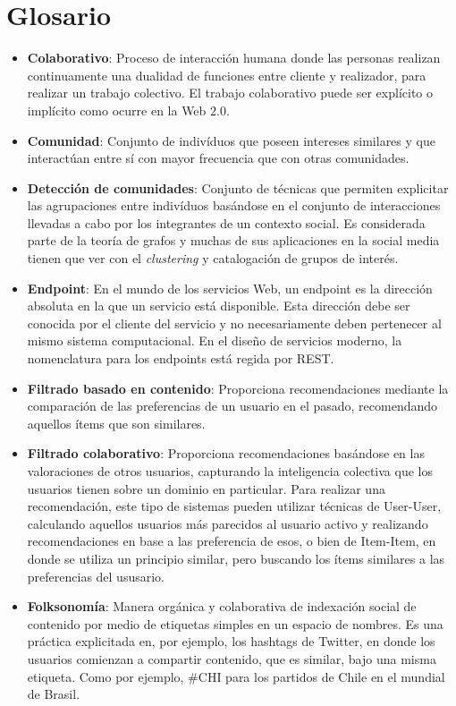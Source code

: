
\chapter{Glosario}

\begin{itemize}
	\item \textbf{Colaborativo}: Proceso de interacción humana donde las personas realizan continuamente una dualidad de funciones entre cliente y realizador, para realizar un trabajo colectivo. El trabajo colaborativo puede ser explícito o implícito como ocurre en la Web 2.0.
	\item \textbf{Comunidad}: Conjunto de indivíduos que poseen intereses similares y que interactúan entre sí con mayor frecuencia que con otras comunidades.
	\item \textbf{Detección de comunidades}: Conjunto de técnicas que permiten explicitar las agrupaciones entre indivíduos basándose en el conjunto de interacciones llevadas a cabo por los integrantes de un contexto social. Es considerada parte de la teoría de grafos y muchas de sus aplicaciones en la social media tienen que ver con el \textit{clustering} y catalogación de grupos de interés.
	\item \textbf{Endpoint}: En el mundo de los servicios Web, un endpoint es la dirección absoluta en la que un servicio está disponible. Esta dirección debe ser conocida por el cliente del servicio y no necesariamente deben pertenecer al mismo sistema computacional. En el diseño de servicios moderno, la nomenclatura para los endpoints está regida por REST.
	\item \textbf{Filtrado basado en contenido}: Proporciona recomendaciones mediante la comparación de las preferencias de un usuario en el pasado, recomendando aquellos ítems que son similares.
	\item \textbf{Filtrado colaborativo}: Proporciona recomendaciones basándose en las valoraciones de otros usuarios, capturando la inteligencia colectiva que los usuarios tienen sobre un dominio en particular. Para realizar una recomendación, este tipo de sistemas pueden utilizar técnicas de User-User, calculando aquellos usuarios más parecidos al usuario activo y realizando recomendaciones en base a las preferencia de esos, o bien de Item-Item, en donde se utiliza un principio similar, pero buscando los ítems similares a las preferencias del ususario.
	\item \textbf{Folksonomía}: Manera orgánica y colaborativa de indexación social de contenido por medio de etiquetas simples en un espacio de nombres. Es una práctica explicitada en, por ejemplo, los hashtags de Twitter, en donde los usuarios comienzan a compartir contenido, que es similar, bajo una misma etiqueta. Como por ejemplo, #CHI para los partidos de Chile en el mundial de Brasil.

\end{itemize}
